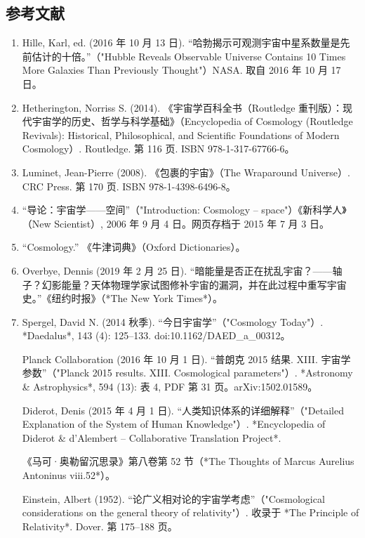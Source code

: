 \subsection{参考文献}
\begin{enumerate}
\item Hille, Karl, ed. (2016 年 10 月 13 日). “哈勃揭示可观测宇宙中星系数量是先前估计的十倍。”（"Hubble Reveals Observable Universe Contains 10 Times More Galaxies Than Previously Thought"）NASA. 取自 2016 年 10 月 17 日。  
\item Hetherington, Norriss S. (2014). 《宇宙学百科全书（Routledge 重刊版）：现代宇宙学的历史、哲学与科学基础》（Encyclopedia of Cosmology (Routledge Revivals): Historical, Philosophical, and Scientific Foundations of Modern Cosmology）. Routledge. 第 116 页. ISBN 978-1-317-67766-6。  
\item Luminet, Jean-Pierre (2008). 《包裹的宇宙》（The Wraparound Universe）. CRC Press. 第 170 页. ISBN 978-1-4398-6496-8。  
\item “导论：宇宙学——空间”（"Introduction: Cosmology – space"）《新科学人》（New Scientist）, 2006 年 9 月 4 日。网页存档于 2015 年 7 月 3 日。  
\item “Cosmology.” 《牛津词典》（Oxford Dictionaries）。  

\item Overbye, Dennis (2019 年 2 月 25 日). “暗能量是否正在扰乱宇宙？——轴子？幻影能量？天体物理学家试图修补宇宙的漏洞，并在此过程中重写宇宙史。”《纽约时报》（*The New York Times*）。  

\item Spergel, David N. (2014 秋季). “今日宇宙学”（"Cosmology Today"）. *Daedalus*, 143 (4): 125–133. doi:10.1162/DAED_a_00312。  

Planck Collaboration (2016 年 10 月 1 日). “普朗克 2015 结果. XIII. 宇宙学参数”（"Planck 2015 results. XIII. Cosmological parameters"）. *Astronomy & Astrophysics*, 594 (13): 表 4, PDF 第 31 页。arXiv:1502.01589。  

Diderot, Denis (2015 年 4 月 1 日). “人类知识体系的详细解释”（"Detailed Explanation of the System of Human Knowledge"）. *Encyclopedia of Diderot & d'Alembert – Collaborative Translation Project*.  

《马可·奥勒留沉思录》第八卷第 52 节（*The Thoughts of Marcus Aurelius Antoninus viii.52*）。  

Einstein, Albert (1952). “论广义相对论的宇宙学考虑”（"Cosmological considerations on the general theory of relativity"）. 收录于 *The Principle of Relativity*. Dover. 第 175–188 页。  


\end{enumerate}
